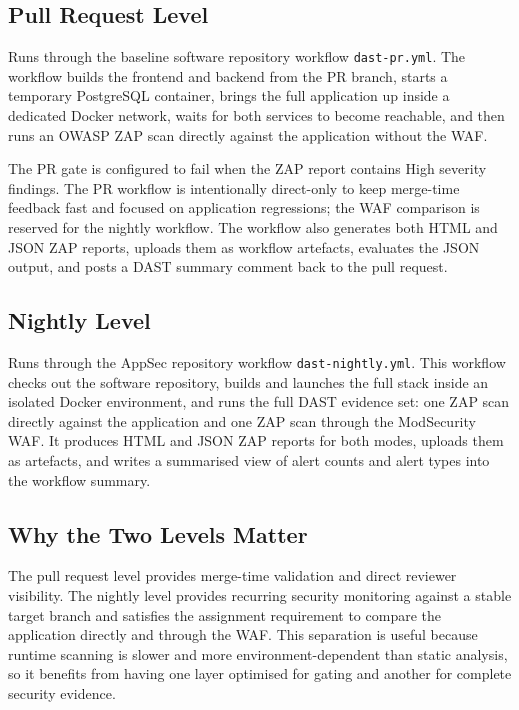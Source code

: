 \documentclass[12pt,a4paper]{report}
\begin{document}
\subsection{Pull Request Level}

Runs through the baseline software repository workflow \texttt{dast-pr.yml}. The workflow builds the frontend and backend from the PR branch, starts a temporary PostgreSQL container, brings the full application up inside a dedicated Docker network, waits for both services to become reachable, and then runs an OWASP ZAP scan directly against the application without the WAF.

The PR gate is configured to fail when the ZAP report contains High severity findings. The PR workflow is intentionally direct-only to keep merge-time feedback fast and focused on application regressions; the WAF comparison is reserved for the nightly workflow. The workflow also generates both HTML and JSON ZAP reports, uploads them as workflow artefacts, evaluates the JSON output, and posts a DAST summary comment back to the pull request.

\subsection{Nightly Level}

Runs through the AppSec repository workflow \texttt{dast-nightly.yml}. This workflow checks out the software repository, builds and launches the full stack inside an isolated Docker environment, and runs the full DAST evidence set: one ZAP scan directly against the application and one ZAP scan through the ModSecurity WAF. It produces HTML and JSON ZAP reports for both modes, uploads them as artefacts, and writes a summarised view of alert counts and alert types into the workflow summary.

\subsection{Why the Two Levels Matter}

The pull request level provides merge-time validation and direct reviewer visibility. The nightly level provides recurring security monitoring against a stable target branch and satisfies the assignment requirement to compare the application directly and through the WAF. This separation is useful because runtime scanning is slower and more environment-dependent than static analysis, so it benefits from having one layer optimised for gating and another for complete security evidence.
\end{document}
